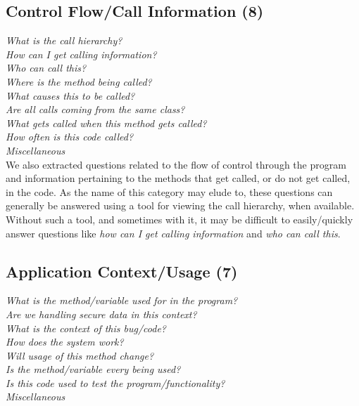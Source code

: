 \documentclass[conference]{IEEEtran}
\begin{document}

\noindent\subsection{\textbf{Control Flow/Call Information (8)}}

\noindent\emph{What is the call hierarchy?} \\
\emph{How can I get calling information?} \\
\emph{Who can call this?} \\
\emph{Where is the method being called?} \\
\emph{What causes this to be called?} \\
\emph{Are all calls coming from the same class?} \\
\emph{What gets called when this method gets called?} \\
\emph{How often is this code called?} \\
\emph{Miscellaneous} \\

We also extracted questions related to the flow of control through the program and information pertaining to the methods that get called, or do not get called, in the code. As the name of this category may elude to, these questions can generally be answered using a tool for viewing the call hierarchy, when available. Without such a tool, and sometimes with it, it may be difficult to easily/quickly answer questions like \emph{how can I get calling information} and \emph{who can call this}. 



\noindent\subsection{\textbf{Application Context/Usage (7)}}

\noindent\emph{What is the method/variable used for in the program?} \\
\emph{Are we handling secure data in this context?} \\
\emph{What is the context of this bug/code?} \\
\emph{How does the system work?} \\
\emph{Will usage of this method change?} \\
\emph{Is the method/variable every being used?} \\
\emph{Is this code used to test the program/functionality?} \\
\emph{Miscellaneous} \\
\end{document}
